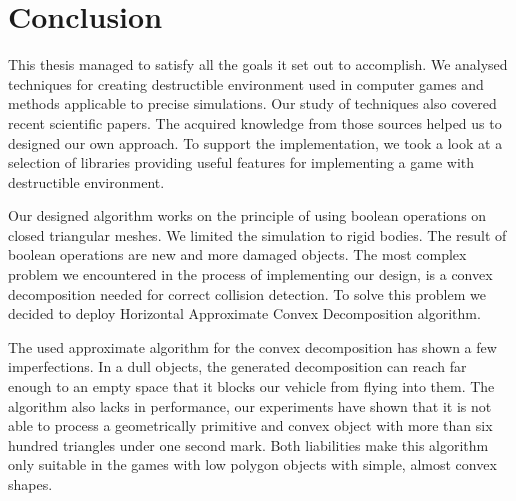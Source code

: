 \chapter*{Conclusion}

This thesis managed to satisfy all the goals it set out to accomplish. We analysed techniques for creating destructible environment used in computer games and methods applicable to precise simulations. Our study of techniques also covered recent scientific papers. The acquired knowledge from those sources helped us to designed our own approach. To support the implementation, we took a look at a selection of libraries providing useful features for  implementing a game with destructible environment.

Our designed algorithm works on the principle of using boolean operations on closed triangular meshes. We limited the simulation to rigid bodies. The result of boolean operations are new and more damaged objects. The most complex problem we encountered in the process of implementing our design, is a convex decomposition needed for correct collision detection. To solve this problem we decided to deploy Horizontal Approximate Convex Decomposition algorithm.

The used approximate algorithm for the convex decomposition has shown a few imperfections. In a dull objects, the generated decomposition can reach far enough to an empty space that it blocks our vehicle from flying into them. The algorithm also lacks in performance, our experiments have shown that it is not able to process a geometrically primitive and convex object with more than six hundred triangles under one second mark. Both liabilities make this algorithm only suitable in the games with low polygon objects with simple, almost convex shapes.



